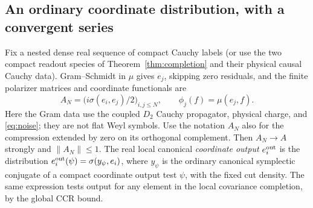 \documentclass[11pt]{article}
\begin{document}
\subsection{An ordinary coordinate distribution, with a convergent series}

Fix a nested dense real sequence of compact Cauchy labels (or use the two compact readout species of Theorem~\ref{thm:completion} and their physical causal Cauchy data). Gram--Schmidt in \(\mu\) gives \(e_j\), skipping zero residuals, and the finite polarizer matrices and coordinate functionals are
\[
 A_N=\bigl(i\sigma(e_i,e_j)/2\bigr)_{i,j\le N},\qquad
 \phi_j(f)=\mu(e_j,f).
\]
Here the Gram data use the coupled \(D_2\) Cauchy propagator, physical charge, and \eqref{eq:noise}; they are not flat Weyl symbols. Use the notation \(A_N\) also for the compression extended by zero on its orthogonal complement. Then \(A_N\to A\) strongly and \(\|A_N\|\le1\). The real local canonical \emph{coordinate output} \(e_i^{\rm out}\) is the distribution
\(e_i^{\rm out}(\psi)=\sigma(y_\psi,e_i)\), where \(y_\psi\) is the ordinary canonical symplectic conjugate of a compact coordinate output test \(\psi\), with the fixed cut density. The same expression tests output for any element in the local covariance completion, by the global CCR bound.
\end{document}
